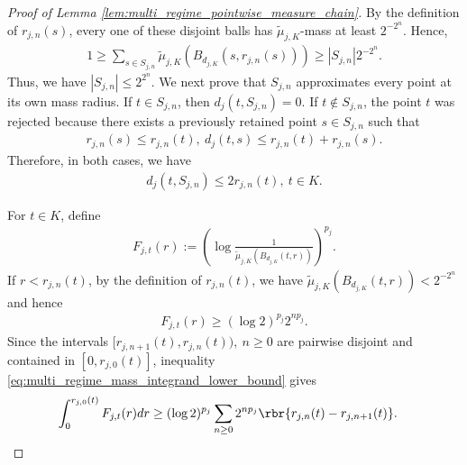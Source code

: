 \documentclass[11pt]{article}
\begin{document}
\begin{proof}[Proof of Lemma
\ref{lem:multi_regime_pointwise_measure_chain}]
By the definition of $r_{j,n}(s)$, every one of these disjoint balls
has $\widetilde\mu_{j,K}$-mass at least $2^{-2^n}$. Hence,
\begin{align*}
1
\ge
\sum_{s\in S_{j,n}}
\widetilde\mu_{j,K}(B_{d_{j,K}}(s,r_{j,n}(s)))
\ge
|S_{j,n}|2^{-2^n}.
\end{align*}
Thus, we have $|S_{j,n}|
\le
2^{2^n}$.
We next prove that $S_{j,n}$ approximates every point at its own mass
radius. If $t\in S_{j,n}$, then $d_j(t,S_{j,n})=0$. If
$t\notin S_{j,n}$, the point $t$ was rejected because there exists a
previously retained point $s\in S_{j,n}$ such that
\begin{align*}
r_{j,n}(s)\le r_{j,n}(t),
\ 
d_j(t,s)
\le
r_{j,n}(t)+r_{j,n}(s).
\end{align*}
Therefore, in both cases, we have
\begin{align}
d_j(t,S_{j,n})
\le
2r_{j,n}(t),
\ t\in K.
\label{eq:multi_regime_mass_net_approximation}
\end{align}

For $t\in K$, define
\begin{align*}
F_{j,t}(r)
:=
\left(
\log\frac{1}{
\widetilde\mu_{j,K}(B_{d_{j,K}}(t,r))
}
\right)^{p_j}.
\end{align*}
If $r<r_{j,n}(t)$, by the definition of $r_{j,n}(t)$, we have
$\widetilde\mu_{j,K}(B_{d_{j,K}}(t,r))
<
2^{-2^n}$ and hence
\begin{align}
F_{j,t}(r)
\ge
(\log2)^{p_j}2^{np_j}.
\label{eq:multi_regime_mass_integrand_lower_bound}
\end{align}
Since the intervals $[r_{j,n+1}(t),r_{j,n}(t)),
\ n\ge0$ are pairwise disjoint and contained in $[0,r_{j,0}(t)]$, inequality
\eqref{eq:multi_regime_mass_integrand_lower_bound} gives
\begin{align}
\int_0^{r_{j,0}(t)}F_{j,t}(r)dr
&\ge
(\log2)^{p_j}
\sum_{n\ge0}2^{np_j}
\rbr{r_{j,n}(t)-r_{j,n+1}(t)}.
\label{eq:multi_regime_mass_integral_radius_differences}
\end{align}


\end{proof}
\end{document}
